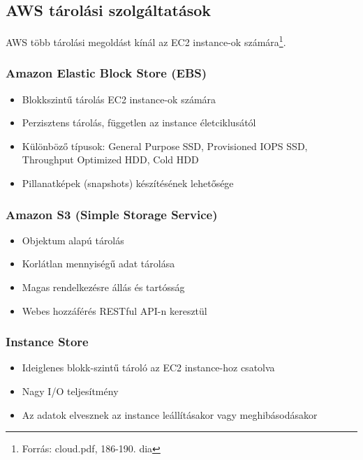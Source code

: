 \documentclass[a4paper,12pt]{article}
\begin{document}
    \subsection{AWS tárolási szolgáltatások}

    AWS több tárolási megoldást kínál az EC2 instance-ok számára\footnote{Forrás: cloud.pdf, 186-190. dia}.

    \subsubsection{Amazon Elastic Block Store (EBS)}

    \begin{itemize}
        \item Blokkszintű tárolás EC2 instance-ok számára
        \item Perzisztens tárolás, független az instance életciklusától
        \item Különböző típusok: General Purpose SSD, Provisioned IOPS SSD, Throughput Optimized HDD, Cold HDD
        \item Pillanatképek (snapshots) készítésének lehetősége
    \end{itemize}

    \subsubsection{Amazon S3 (Simple Storage Service)}

    \begin{itemize}
        \item Objektum alapú tárolás
        \item Korlátlan mennyiségű adat tárolása
        \item Magas rendelkezésre állás és tartósság
        \item Webes hozzáférés RESTful API-n keresztül
    \end{itemize}

    \subsubsection{Instance Store}

    \begin{itemize}
        \item Ideiglenes blokk-szintű tároló az EC2 instance-hoz csatolva
        \item Nagy I/O teljesítmény
        \item Az adatok elvesznek az instance leállításakor vagy meghibásodásakor
    \end{itemize}
\end{document}

